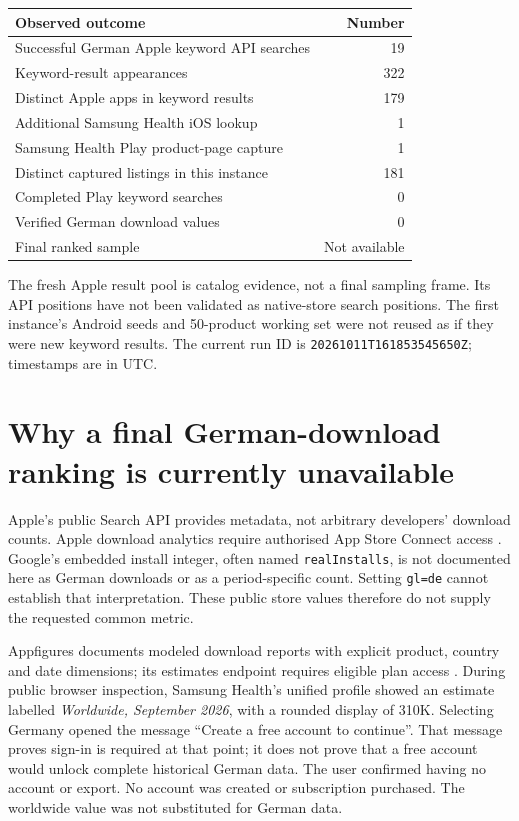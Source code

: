 \documentclass[10pt,a4paper]{article}
\begin{document}
\begin{tabular}{L{97mm}r}\toprule
Observed outcome & Number\\\midrule
Successful German Apple keyword API searches & 19\\
Keyword-result appearances & 322\\
Distinct Apple apps in keyword results & 179\\
Additional Samsung Health iOS lookup & 1\\
Samsung Health Play product-page capture & 1\\
Distinct captured listings in this instance & 181\\
Completed Play keyword searches & 0\\
Verified German download values & 0\\
Final ranked sample & Not available\\\bottomrule
\end{tabular}

The fresh Apple result pool is catalog evidence, not a final sampling frame.
Its API positions have not been validated as native-store search positions.
The first instance's Android seeds and 50-product working set were not reused
as if they were new keyword results. The current run ID is
\texttt{20261011T161853545650Z}; timestamps are in UTC.

\section{Why a final German-download ranking is currently unavailable}
Apple's public Search API provides metadata, not arbitrary developers' download
counts. Apple download analytics require authorised App Store Connect access
\cite{appleapi,appleanalytics}. Google's embedded install integer, often named
\texttt{realInstalls}, is not documented here as German downloads or as a
period-specific count. Setting \texttt{gl=de} cannot establish that interpretation.
These public store values therefore do not supply the requested common metric.

Appfigures documents modeled download reports with explicit product, country and
date dimensions; its estimates endpoint requires eligible plan access
\cite{estimates}. During public browser inspection, Samsung Health's unified
profile showed an estimate labelled \emph{Worldwide, September 2026}, with a rounded
display of 310K. Selecting Germany opened the message ``Create a free account to
continue''. That message proves sign-in is required at that point; it does not
prove that a free account would unlock complete historical German data. The user
confirmed having no account or export. No account was created or subscription
purchased. The worldwide value was not substituted for German data.
\end{document}
